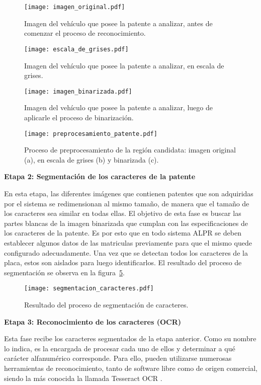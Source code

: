 \begin{figure}[H]
	\centering
	\texttt{[image: imagen\_original.pdf]}
	\caption{Imagen del vehículo que posee la patente a analizar, antes de comenzar el proceso de reconocimiento.}
	\label{fig:img_orig}
\end{figure}
\begin{figure}[H]
	\centering
	\texttt{[image: escala\_de\_grises.pdf]}
	\caption{Imagen del vehículo que posee la patente a analizar, en escala de grises.}
	\label{fig:img_grey}
\end{figure} 
\begin{figure}[H]
	\centering
	\texttt{[image: imagen\_binarizada.pdf]}
	\caption{Imagen del vehículo que posee la patente a analizar,  luego de aplicarle el proceso de binarización.}
	\label{fig:img_bin}
\end{figure}
\begin{figure}[H]
	\centering
	\texttt{[image: preprocesamiento\_patente.pdf]}
	\caption{Proceso de preprocesamiento de la región candidata: imagen original (a),  en escala de grises (b) y binarizada (c).}
	\label{fig:img_prepro}
\end{figure}


\noindent \textbf{Etapa 2: Segmentación de los caracteres de la patente}

En esta etapa, las diferentes imágenes que contienen patentes que son adquiridas por el sistema se redimensionan al mismo tamaño, de manera que el tamaño de los caracteres sea similar en todas ellas. El objetivo de esta fase es buscar las partes blancas de la imagen binarizada que cumplan con las especificaciones de los caracteres de la patente. Es por esto que en todo sistema ALPR se deben establecer algunos datos de las matriculas previamente para que el mismo quede configurado adecuadamente. Una vez que se detectan todos los caracteres de la placa, estos son aislados para luego identificarlos. El resultado del proceso de segmentación se observa en la figura~\ref{fig:img_segm}.

\begin{figure}[H]
	\centering
	\texttt{[image: segmentacion\_caracteres.pdf]}
	\caption{Resultado del proceso de segmentación de caracteres.}
	\label{fig:img_segm}
\end{figure}


\noindent \textbf{Etapa 3: Reconocimiento de los caracteres (OCR)}

Esta fase recibe los caracteres segmentados de la etapa anterior. Como su nombre lo indica, es la encargada de procesar cada uno de ellos y determinar a qué carácter alfanumérico corresponde. Para ello, pueden utilizarse numerosas herramientas de reconocimiento, tanto de software libre como de origen comercial, siendo la más conocida la llamada Tesseract OCR \cite{tesseractdoc}.

